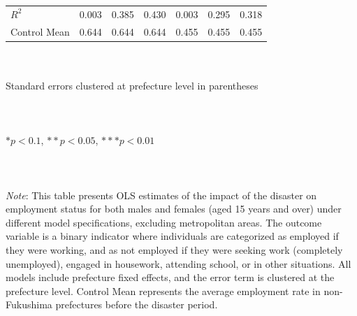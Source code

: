 \documentclass[serif, aspectratio=169]{beamer}
\newcommand{\employmentprobabilitylinks}{%
    \vfill %
    \hfill %
    {\small %
        \hyperlink{employed_placebo}{\beamerbutton{Placebo test}} \,
    }
}
\begin{document}
\begin{frame}[label=employed]
\begin{table}[htbp]
\begin{tabular}{@{}l*{6}{c}@{}}
$\textit{R}^2$&    0.003         &    0.385         &    0.430         &    0.003         &    0.295         &    0.318         \\
Control Mean&    0.644         &    0.644         &    0.644         &    0.455         &    0.455         &    0.455         \\
\bottomrule
\end{tabular}
\\\\{\linewidth}{\tiny Standard errors clustered at prefecture level in parentheses}\\\\
\\\\{\linewidth}{\tiny $*p<0.1$, $**p<0.05$, $***p<0.01$}\\\\
\\\\{\linewidth}{\tiny \textit{Note}: This table presents OLS estimates of the impact of the disaster on employment status for both males and females (aged 15 years and over) under different model specifications, excluding metropolitan areas. The outcome variable is a binary indicator where individuals are categorized as employed if they were working, and as not employed if they were seeking work (completely unemployed), engaged in housework, attending school, or in other situations. All models include prefecture fixed effects, and the error term is clustered at the prefecture level. Control Mean represents the average employment rate in non-Fukushima prefectures before the disaster period.}
\end{table}

\vspace{-2.2cm}
\employmentprobabilitylinks


\end{frame}

\end{document}
